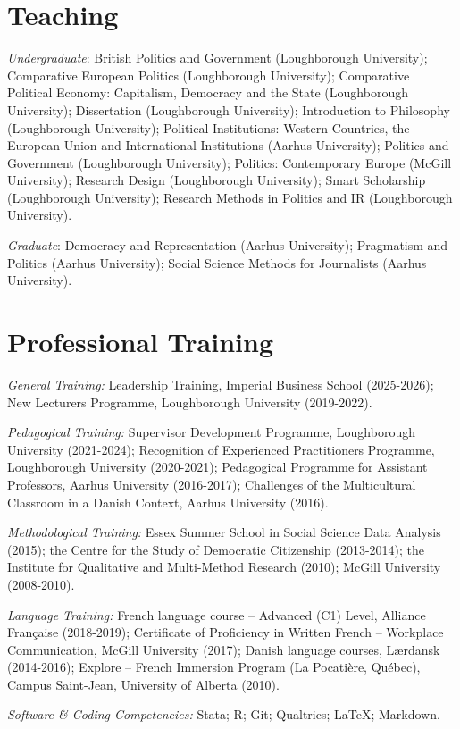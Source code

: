 \documentclass[letterpaper,fontsize=10.5pt]{scrartcl}
\begin{document}
\section{Teaching}
{}\textit{Undergraduate}: British Politics and Government (Loughborough University); Comparative European Politics (Loughborough University); Comparative Political Economy: Capitalism, Democracy and the State  (Loughborough University); Dissertation (Loughborough University); Introduction to Philosophy (Loughborough University); Political Institutions: Western Countries, the European Union and International Institutions (Aarhus University); Politics and Government (Loughborough University); Politics: Contemporary Europe (McGill University); Research Design (Loughborough University); Smart Scholarship (Loughborough University); Research Methods in Politics and IR (Loughborough University).\\
\hfill \break
{}
{}\textit{Graduate}: Democracy and Representation (Aarhus University); Pragmatism and Politics (Aarhus University); Social Science Methods for Journalists (Aarhus University).

\section{Professional Training}
{}\textit{General Training:} Leadership Training, Imperial Business School (2025-2026);
 New Lecturers Programme, Loughborough University (2019-2022).\\
\hfill \break
{}
{}\textit{Pedagogical Training:} Supervisor Development Programme, Loughborough University (2021-2024); Recognition of Experienced Practitioners Programme, Loughborough University (2020-2021); Pedagogical Programme for Assistant Professors, Aarhus University (2016-2017); Challenges of the Multicultural Classroom in a Danish Context, Aarhus University (2016).\\
\hfill \break
{}
{}\textit{Methodological Training:} Essex Summer School in Social Science Data Analysis (2015); the Centre for the Study of Democratic Citizenship (2013-2014); the Institute for Qualitative and Multi-Method Research (2010); McGill University (2008-2010).\\
\hfill \break
{}
{}\textit{Language Training:} French language course – Advanced (C1) Level, Alliance Française (2018-2019); Certificate of Proficiency in Written French – Workplace Communication, McGill University (2017); Danish language courses, Lærdansk (2014-2016); Explore – French Immersion Program (La Pocatière, Québec), Campus Saint-Jean, University of Alberta (2010).\\
\hfill \break
{}
{}\textit{Software \& Coding Competencies:} Stata; R; Git; Qualtrics; \LaTeX ; Markdown.
\end{document}
